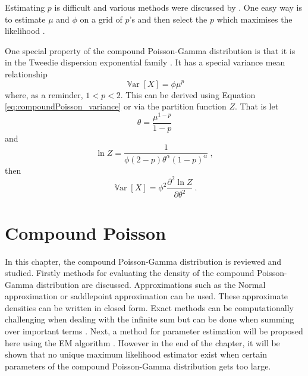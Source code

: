 \documentclass[12pt, a4paper]{memoir}
\DeclareMathOperator{\variance}{\mathbb{V}ar}
\begin{document}
Estimating $p$ is difficult and various methods were discussed by \cite{zhang2013likelihood}. One easy way is to estimate $\mu$ and $\phi$ on a grid of $p$'s and then select the $p$ which maximises the likelihood \citep{dunn2005series}.

One special property of the compound Poisson-Gamma distribution is that it is in the Tweedie dispersion exponential family \citep{jorgensen1987exponential}. It has a special variance mean relationship
\begin{equation}
	\variance[X] = \phi \mu^p
\end{equation}
where, as a reminder, $1<p<2$. This can be derived using Equation \eqref{eq:compoundPoisson_variance} or via the partition function $Z$. That is let
\begin{equation}
	\theta = \frac{\mu^{1-p}}{1-p}
\end{equation}
and
\begin{equation}
	\ln Z = \frac{1}{\phi(2-p)\theta^\alpha(1-p)^\alpha} \ ,
\end{equation}
then
\begin{equation}
	\variance[X] = \phi^2 \frac{\partial^2\ln Z}{\partial\theta^2} \ .
\end{equation}

\chapter{Compound Poisson}
In this chapter, the compound Poisson-Gamma distribution is reviewed and studied. Firstly methods for evaluating the density of the compound Poisson-Gamma distribution are discussed. Approximations such as the Normal approximation or saddlepoint approximation \citep{daniels1954saddlepoint} can be used. These approximate densities can be written in closed form. Exact methods can be computationally challenging when dealing with the infinite sum but can be done when summing over important terms \citep{dunn2005series}. Next, a method for parameter estimation will be proposed here using the EM algorithm \citep{dempster1977maximum}. However in the end of the chapter, it will be shown that no unique maximum likelihood estimator exist when certain parameters of the compound Poisson-Gamma distribution gets too large.
\end{document}
